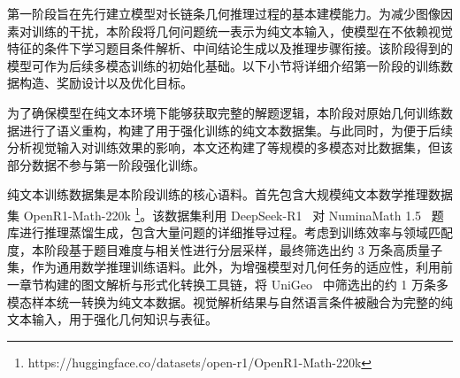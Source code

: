 
第一阶段旨在先行建立模型对长链条几何推理过程的基本建模能力。为减少图像因素对训练的干扰，本阶段将几何问题统一表示为纯文本输入，使模型在不依赖视觉特征的条件下学习题目条件解析、中间结论生成以及推理步骤衔接。该阶段得到的模型可作为后续多模态训练的初始化基础。以下小节将详细介绍第一阶段的训练数据构造、奖励设计以及优化目标。



为了确保模型在纯文本环境下能够获取完整的解题逻辑，本阶段对原始几何训练数据进行了语义重构，构建了用于强化训练的纯文本数据集。与此同时，为便于后续分析视觉输入对训练效果的影响，本文还构建了等规模的多模态对比数据集，但该部分数据不参与第一阶段强化训练。



纯文本训练数据集是本阶段训练的核心语料。首先包含大规模纯文本数学推理数据集 OpenR1-Math-220k \footnote{https://huggingface.co/datasets/open-r1/OpenR1-Math-220k}。该数据集利用 DeepSeek-R1~\cite{guo2025deepseekr1} 对 NuminaMath 1.5~\cite{li2024numinamath} 题库进行推理蒸馏生成，包含大量问题的详细推导过程。考虑到训练效率与领域匹配度，本阶段基于题目难度与相关性进行分层采样，最终筛选出约 3 万条高质量子集，作为通用数学推理训练语料。此外，为增强模型对几何任务的适应性，利用前一章节构建的图文解析与形式化转换工具链，将 UniGeo~\cite{chen2022unigeo} 中筛选出的约 1 万条多模态样本统一转换为纯文本数据。视觉解析结果与自然语言条件被融合为完整的纯文本输入，用于强化几何知识与表征。

